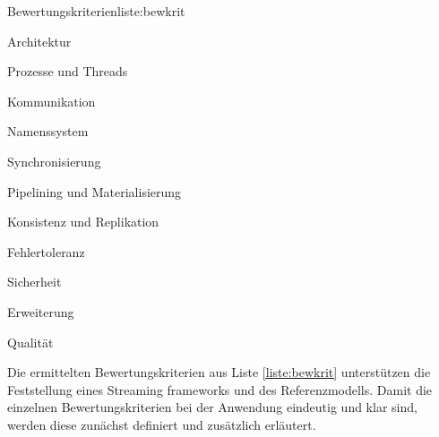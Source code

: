 \begin{itemlist}{Bewertungskriterien}{liste:bewkrit}
	\item Architektur
	\item Prozesse und Threads
	\item Kommunikation
	\item Namenssystem
	\item Synchronisierung
	\item Pipelining und Materialisierung
	\item Konsistenz und Replikation	
	\item Fehlertoleranz
	\item Sicherheit	
	\item Erweiterung
	\item Qualität
\end{itemlist}

Die ermittelten Bewertungskriterien aus Liste \ref{liste:bewkrit} unterstützen die Feststellung eines Streaming frameworks und des Referenzmodells. Damit die einzelnen Bewertungskriterien bei der Anwendung eindeutig und klar sind, werden diese zunächst definiert und zusätzlich erläutert.

